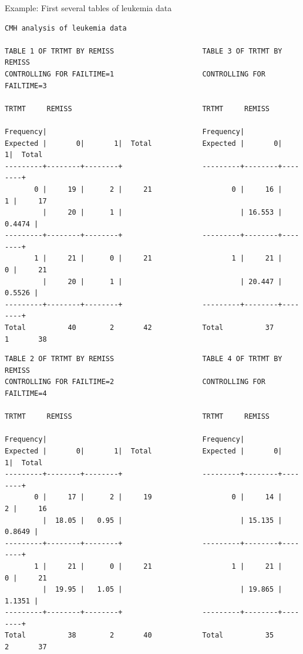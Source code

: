 \documentclass[envcountsect, 10pt, portrait, palatino]{beamer}
\begin{document}
\begin{frame}[fragile]{Example: First several tables of leukemia data}

\scriptsize
\begin{verbatim}
CMH analysis of leukemia data

TABLE 1 OF TRTMT BY REMISS                     TABLE 3 OF TRTMT BY REMISS
CONTROLLING FOR FAILTIME=1                     CONTROLLING FOR FAILTIME=3

TRTMT     REMISS                               TRTMT     REMISS

Frequency|                                     Frequency|
Expected |       0|       1|  Total            Expected |       0|       1|  Total
---------+--------+--------+                   ---------+--------+--------+
       0 |     19 |      2 |     21                   0 |     16 |      1 |     17
         |     20 |      1 |                            | 16.553 | 0.4474 |
---------+--------+--------+                   ---------+--------+--------+
       1 |     21 |      0 |     21                   1 |     21 |      0 |     21
         |     20 |      1 |                            | 20.447 | 0.5526 |
---------+--------+--------+                   ---------+--------+--------+
Total          40        2       42            Total          37        1       38
\end{verbatim}
\end{frame}

\begin{frame}[fragile]{}

\scriptsize
\begin{verbatim}
TABLE 2 OF TRTMT BY REMISS                     TABLE 4 OF TRTMT BY REMISS
CONTROLLING FOR FAILTIME=2                     CONTROLLING FOR FAILTIME=4

TRTMT     REMISS                               TRTMT     REMISS

Frequency|                                     Frequency|
Expected |       0|       1|  Total            Expected |       0|       1|  Total
---------+--------+--------+                   ---------+--------+--------+
       0 |     17 |      2 |     19                   0 |     14 |      2 |     16
         |  18.05 |   0.95 |                            | 15.135 | 0.8649 |
---------+--------+--------+                   ---------+--------+--------+
       1 |     21 |      0 |     21                   1 |     21 |      0 |     21
         |  19.95 |   1.05 |                            | 19.865 | 1.1351 |
---------+--------+--------+                   ---------+--------+--------+
Total          38        2       40            Total          35        2       37
\end{verbatim}
\end{frame}
\end{document}
